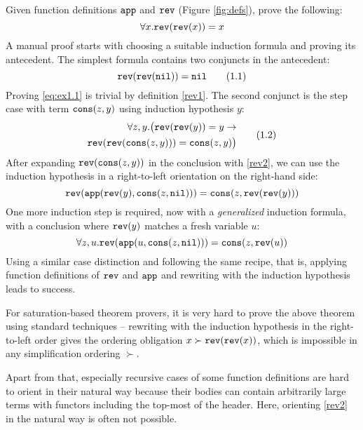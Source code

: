 \begin{example}\label{ex:1}
Given function definitions $\mathtt{app}$ and $\mathtt{rev}$ (Figure \ref{fig:defs}), prove the following:
$$\forall x. \mathtt{rev}(\mathtt{rev}(x))=x$$
A manual proof starts with choosing a suitable induction formula and proving its antecedent. The simplest formula contains two conjuncts in the antecedent:
\begin{equation}\label{eq:ex1.1}\mathtt{rev}(\mathtt{rev}(\mathtt{nil})) = \mathtt{nil}\tag{1.1}\end{equation}
Proving \eqref{eq:ex1.1} is trivial by definition \eqref{rev1}. The second conjunct is the step case with term $\mathtt{cons}(z,y)$ using induction hypothesis $y$:
\begin{align}\begin{split}\forall z,y.\big(\mathtt{rev}(\mathtt{rev}(y))=y\rightarrow\\\mathtt{rev}(\mathtt{rev}(\mathtt{cons}(z,y)))=\mathtt{cons}(z,y)\big)\end{split}\label{eq:ex1.2}\tag{1.2}\end{align}
After expanding $\mathtt{rev}(\mathtt{cons}(z,y))$ in the conclusion with \eqref{rev2}, we can use the induction hypothesis in a right-to-left orientation on the right-hand side:
$$\mathtt{rev}(\mathtt{app}(\mathtt{rev}(y),\mathtt{cons}(z,\mathtt{nil})))=\mathtt{cons}(z,\mathtt{rev}(\mathtt{rev}(y)))$$
One more induction step is required, now with a \textit{generalized} induction formula, with a conclusion where $\mathtt{rev}(y)$ matches a fresh variable $u$:
$$\forall z,u.\mathtt{rev}(\mathtt{app}(u,\mathtt{cons}(z,\mathtt{nil})))=\mathtt{cons}(z,\mathtt{rev}(u))$$
Using a similar case distinction and following the same recipe, that is, applying function definitions of $\mathtt{rev}$ and $\mathtt{app}$ and rewriting with the induction hypothesis leads to success.
\end{example}

For saturation-based theorem provers, it is very hard to prove the above theorem using standard techniques -- rewriting with the induction hypothesis in the right-to-left order gives the ordering obligation $x \succ \mathtt{rev}(\mathtt{rev}(x))$, which is impossible in any simplification ordering $\succ$.

Apart from that, especially recursive cases of some function definitions are hard to orient in their natural way because their bodies can contain arbitrarily large terms with functors including the top-most of the header. Here, orienting \eqref{rev2} in the natural way is often not possible.

